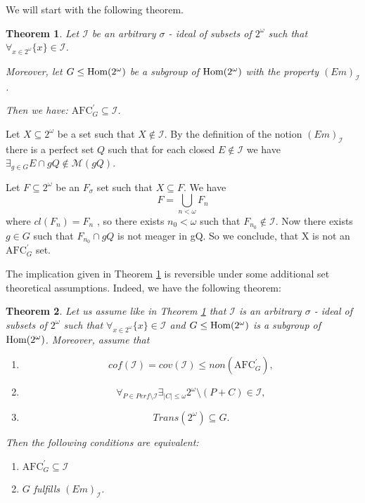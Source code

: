 \documentclass[b5cutpaper, twoside, 11pt, leqno]{moravica}
\newcommand{\nlto}{n < \omega}
\newcommand{\calI}{\mathcal{I}}
\newcommand{\afc}{\mathrm{AFC}}
\newcommand{\afcp}{\afc^\prime}
\newcommand\afcg{\afcp_{G}}
\newcommand\trans{\mathit{Trans}(\ca)}
\newcommand{\seq}{\subseteq}
\newcommand{\ca}{2^{\omega}}
\newcommand{\mgr}{\mathcal{M}}
\newcommand{\oo}{\omega}
\newcommand{\perf}{\mathit{Perf}}
\newcommand{\cof}{\mathit{cof}}
\newcommand{\cov}{\mathit{cov}}
\newcommand{\non}{\mathit{non}}
\newcommand\Hom{{\rm Hom(\ca)}}
\newtheorem{theorem}{Theorem}[section]
\theoremstyle{definition}
\begin{document}
We will start with the following theorem.

\begin{theorem}
\label{em=>afcg->i}
  Let $\calI$ be an arbitrary $\sigma$ - ideal of subsets of $\ca$
such that $\forall_{x\in\ca} \lbrace x \rbrace \in \calI$.

  Moreover, let $G \leq \Hom$
be a subgroup of $\Hom$ with the property $(Em)_{\calI}$.

  Then we have:
$\afcg \seq \calI$.
\end{theorem}

\proof

Let $X \seq \ca$ be a set such that $X \not\in \calI$.
By the definition of
the notion $(Em)_{\calI}$ there is a perfect set $Q$ such that
for each closed $E \not\in \calI$ we have
$\exists_{g \in G} E \cap gQ \not\in \mgr(gQ)$.

Let $F \seq \ca$ be an $F_{\sigma}$ set
such that $X \seq F$.
We have
$$F = \bigcup_{ \nlto } F_n$$
where $cl(F_n) = F_n$ , so there exists $n_0 < \omega$
such that $F_{n_0} \not\in \calI$.
Now there exists $g \in G$
such that $F_{n_0} \cap gQ$
is not meager in gQ.
So we conclude, that X is not an $\afcg$ set.

\bigskip

The implication given in Theorem \ref{em=>afcg->i} is reversible
under some additional set theoretical assumptions.
Indeed, we have the following theorem:

\begin{theorem}
\label{em<=>afcg->i}
  Let us assume like in Theorem \ref{em=>afcg->i}
that $\calI$ is an arbitrary $\sigma$ - ideal of subsets of $\ca$
such that $\forall_{x\in\ca} \lbrace x \rbrace \in \calI$ and
$G \leq \Hom$ is a subgroup of $\Hom$.
  Moreover, assume that
\begin{enumerate}
  \item
    \[ \cof(\calI) = \cov(\calI) \leq \non(\afcg), \]
  \item
    \[ \forall_{P\in\perf\setminus\calI} \exists_{|C| \leq \oo}
      \ca \setminus (P + C) \in \calI, \]
  \item
    \[ \trans \seq G. \]
\end{enumerate}

Then the following conditions are equivalent:

\begin{enumerate}
  \item
    $\afcg \seq \calI$
  \item
    $G$ fulfills $(Em)_{\calI}$.
\end{enumerate}
\end{theorem}
\end{document}

